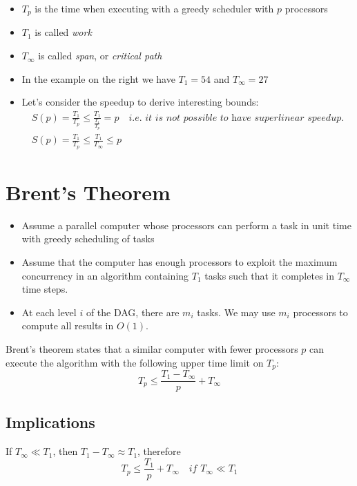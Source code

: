 \begin{paracol}{2}
   \switchcolumn
\begin{itemize}
   \item $T_p$ is the time when executing with a greedy scheduler with $p$ processors
   \item $T_1$ is called \textit{work}
   \item $T_{\infty}$ is called \textit{span}, or \textit{critical path}
   \item In the example on the right we have $T_1 = 54$ and $T_{\infty} = 27$
   \item Let's consider the speedup to derive interesting bounds:
   \begin{align}
      S(p) = \frac{T_1}{T_p} \leq \frac{T_1}{\frac{T_1}{T_p}} = p \quad \textit{i.e. it is not possible to have superlinear speedup.}\\
      S(p) = \frac{T_1}{T_p} \leq \frac{T_1}{T_{\infty}} \leq p
   \end{align}
\end{itemize}
\end{paracol}

\section{Brent's Theorem}

\begin{itemize}
	\item Assume a parallel computer whose processors can perform a task in unit time with greedy scheduling of
tasks
	\item Assume that the computer has enough processors to exploit the maximum concurrency in an algorithm
containing $T_1$ tasks such that it completes in $T_{\infty}$ time steps.
	\item At each level $i$ of the DAG, there are $m_i$ tasks. We may use $m_i$ processors to compute all results in $O(1)$.
\end{itemize}
Brent's theorem states that a similar computer with fewer processors $p$ can execute the algorithm with the
following upper time limit on $T_p$:
\begin{equation}
   T_p \leq \frac{T_1 - T_{\infty}}{p} + T_{\infty}
\end{equation}

\subsection{Implications}
If $T_{\infty} \ll T_1$, then $T_1 - T_{\infty} \approx T_1$, therefore 
\begin{equation}
   T_p \leq \frac{T_1}{p} + T_{\infty} \quad \textit{if } T_{\infty} \ll T_1
\end{equation}

